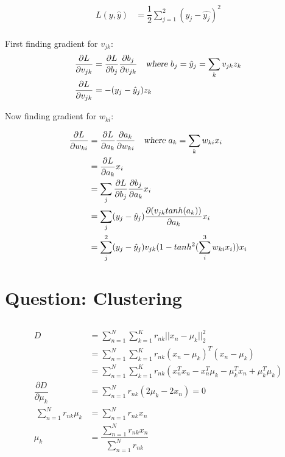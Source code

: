 \documentclass[paper=a4, fontsize=11pt]{scrartcl} %
\numberwithin{equation}{section} %
\numberwithin{figure}{section} %
\numberwithin{table}{section} %
\begin{document}
\begin{align*}
L(y,\hat{y}) &= \dfrac{1}{2} \sum_{j=1}^{2} (y_{j} - \hat{y_{j}})^{2}\\
\end{align*}

First finding gradient for $v_{jk}$:
\begin{align*}
\dfrac{\partial L}{\partial v_{jk}} &= \dfrac{\partial L}{\partial b_{j}} \dfrac{\partial b_{j}}{\partial v_{jk}} ~~~ \textsl{where $b_{j} = \hat{y}_{j} = \sum_{k}v_{jk}z_{k}$}\\
\dfrac{\partial L}{\partial v_{jk}} &= -(y_{j} - \hat{y}_{j})z_{k}\\
\end{align*}

Now finding gradient for $w_{ki}$:

\begin{align*}
\dfrac{\partial L}{\partial w_{ki}} &= \dfrac{\partial L}{\partial a_{k}} \dfrac{\partial a_{k}}{\partial w_{ki}} ~~~
\textsl{where $a_{k} = \sum_{k}w_{ki}x_{i}$}\\
&= \dfrac{\partial L}{\partial a_{k}} x_{i}\\
&= \sum_{j} \dfrac{\partial L}{\partial b_{j}} \dfrac{\partial b_{j}}{\partial a_{k}} x_{i}\\
&= \sum_{j} (y_{j}-\hat{y}_{j})\dfrac{\partial (v_{jk}tanh(a_{k}))}{\partial a_{k}} x_{i}\\
&= \sum_{j}^{2} (y_{j}-\hat{y}_{j}) v_{jk} (1-tanh^{2}(\sum_{i}^{3}w_{ki}x_{i})) x_{i}
\end{align*}



\section{Question: Clustering}
\subsection{}
\begin{align*}
D &= \sum_{n=1}^{N}\sum_{k=1}^{K}r_{nk} ||x_{n} - \mu_{k}||_{2}^{2}\\
&= \sum_{n=1}^{N}\sum_{k=1}^{K} r_{nk} (x_{n} - \mu_{k})^{T}(x_{n} - \mu_{k})\\
&= \sum_{n=1}^{N}\sum_{k=1}^{K} r_{nk} (x_{n}^{T}x_{n} - x_{n}^{T}\mu_{k} - \mu_{k}^{T}x_{n} + \mu_{k}^{T}\mu_{k})\\
\dfrac{\partial D}{\partial \mu_{k}} &=  \sum_{n=1}^{N} r_{nk} (2\mu_{k} - 2x_{n}) = 0\\\
\sum_{n=1}^{N} r_{nk}\mu_{k} &= \sum_{n=1}^{N}r_{nk}x_{n}\\
\mu_{k} &= \dfrac{\sum_{n=1}^{N}r_{nk}x_{n}}{\sum_{n=1}^{N} r_{nk}}
\end{align*}
\end{document}
